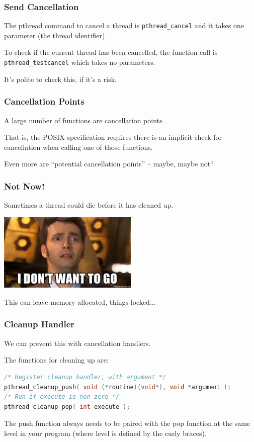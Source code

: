 \begin{frame}
	\frametitle{Send Cancellation}

	The pthread command to cancel a thread is \texttt{pthread\_cancel} and it takes one parameter (the thread identifier).

	To check if the current thread has been cancelled, the function call is \texttt{pthread\_testcancel} which takes no parameters.

	It's polite to check this, if it's a risk.

\end{frame}


\begin{frame}
	\frametitle{Cancellation Points}
	A  large number of functions are \alert{cancellation points}.

	That is, the POSIX specification requires there is an implicit check for cancellation when calling one of those functions.

	Even more are ``potential cancellation points'' -- maybe, maybe not?

\end{frame}



\begin{frame}
	\frametitle{Not Now!}
	Sometimes a thread could die before it has cleaned up.

	\begin{center}
		\includegraphics[width=0.5\textwidth]{images/tenthdoctor.jpeg}
	\end{center}

	This can leave memory allocated, things locked...

\end{frame}


\begin{frame}[fragile]
	\frametitle{Cleanup Handler}

	We can prevent this with cancellation handlers.

	The functions for cleaning up are:

	\begin{lstlisting}[language=C]
/* Register cleanup handler, with argument */ 
pthread_cleanup_push( void (*routine)(void*), void *argument ); 
/* Run if execute is non-zero */ 
pthread_cleanup_pop( int execute ); 
\end{lstlisting}

	The push function always needs to be paired with the pop function at the same level in your program (where level is defined by the curly braces).

\end{frame}


